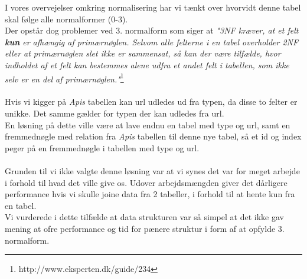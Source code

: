 I vores overvejelser omkring normalisering har vi tænkt over hvorvidt denne tabel skal følge alle normalformer (0-3).
\\
Der opstår dog problemer ved 3. normalform som siger at \textit{"3NF kræver, at et felt \textbf{kun} er afhængig af primærnøglen.
Selvom alle felterne i en tabel overholder 2NF eller at primærnøglen slet ikke er sammensat, så kan der være tilfælde, hvor indholdet af et felt kan bestemmes alene udfra et andet felt i tabellen, som ikke selv er en del af primærnøglen."}\footnote{http://www.eksperten.dk/guide/234}
\\\\
Hvis vi kigger på \textit{Apis} tabellen kan url udledes ud fra typen, da disse to felter er unikke. Det samme gælder for typen der kan udledes fra url.
\\
En løsning på dette ville være at lave endnu en tabel med type og url, samt en fremmednøgle med relation fra \textit{Apis} tabellen til denne nye tabel, så et id og index peger på en fremmednøgle i tabellen med type og url.
\\\\
Grunden til vi ikke valgte denne løsning var at vi synes det var for meget arbejde i forhold til hvad det ville give os. Udover arbejdsmængden giver det dårligere performance hvis vi skulle joine data fra 2 tabeller, i forhold til at hente kun fra en tabel.
\\
Vi vurderede i dette tilfælde at data strukturen var så simpel at det ikke gav mening at ofre performance og tid for pænere struktur i form af at opfylde 3. normalform.
